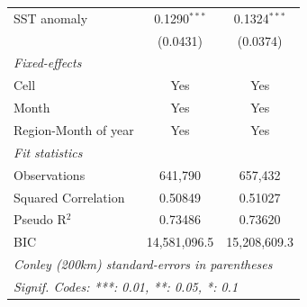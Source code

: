 \begin{table}[htbp]
\begin{tabular}{lcc}
      SST anomaly          & 0.1290$^{***}$        & 0.1324$^{***}$\\   
                           & (0.0431)              & (0.0374)\\   
      \midrule
      \emph{Fixed-effects}\\
      Cell                 & Yes                   & Yes\\  
      Month                & Yes                   & Yes\\  
      Region-Month of year & Yes                   & Yes\\  
      \midrule
      \emph{Fit statistics}\\
      Observations         & 641,790               & 657,432\\  
      Squared Correlation  & 0.50849               & 0.51027\\  
      Pseudo R$^2$         & 0.73486               & 0.73620\\  
      BIC                  & 14,581,096.5          & 15,208,609.3\\  
      \midrule \midrule
      \multicolumn{3}{l}{\emph{Conley (200km) standard-errors in parentheses}}\\
      \multicolumn{3}{l}{\emph{Signif. Codes: ***: 0.01, **: 0.05, *: 0.1}}\\
   \end{tabular}
\end{table}


